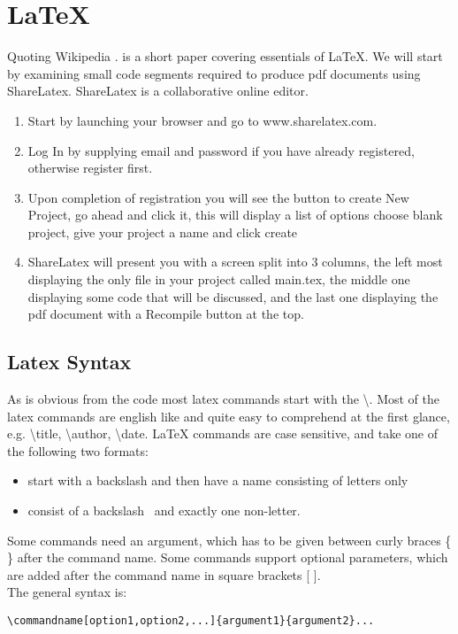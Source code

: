\section{\LaTeX}
Quoting Wikipedia \textbf{}. \cite{warbrick94} is a short paper covering essentials of \LaTeX. We will start by examining small code segments required to produce pdf documents using ShareLatex. ShareLatex is a collaborative online editor.

\begin{enumerate}
\item Start by launching your browser and go to www.sharelatex.com. 
\item Log In by supplying email and password if you have already registered, otherwise register first.
\item Upon completion of registration you will see the button to create New Project, go ahead and click it, this will display a list of options choose blank project, give your project a name and click create
\item ShareLatex will present you with a screen split into 3 columns, the left most displaying the only file in your project called main.tex, the middle one displaying some code that will be discussed, and the last one displaying the pdf document with a Recompile button at the top.
\end{enumerate}
\subsection{Latex Syntax}
As is obvious from the code most latex commands start with the \textbackslash. Most of the latex commands are english like and quite easy to comprehend at the first glance, e.g. \textbackslash title, \textbackslash author, \textbackslash date. 
LaTeX commands are case sensitive, and take one of the following two formats:
\begin{itemize}
\item start with a backslash  and then have a name consisting of letters only
\item consist of a backslash \ and exactly one non-letter.
\end{itemize}
Some commands need an argument, which has to be given between curly braces \{ \} after the command name. Some commands support optional parameters, which are added after the command name in square brackets {[} {]}. \\ 
The general syntax is:
\begin{lstlisting}
\commandname[option1,option2,...]{argument1}{argument2}...
\end{lstlisting}


